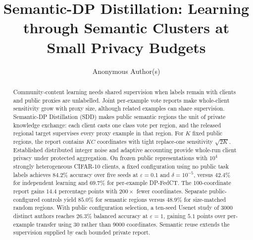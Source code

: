 \documentclass[sigconf,anonymous,review,balance=false]{acmart}
\begin{document}
\title[Semantic-DP Distillation]{Semantic-DP Distillation: Learning through Semantic Clusters
at Small Privacy Budgets}

\author{Anonymous Author(s)}

\begin{abstract}
Community-content learning needs shared supervision when labels remain with
clients and public proxies are unlabelled. Joint per-example vote reports make
whole-client sensitivity grow with proxy size, although related examples can
share supervision. Semantic-DP Distillation (SDD) makes public semantic regions
the unit of private knowledge exchange: each client casts one class vote per
region, and the released regional target supervises every proxy example in
that region. For $K$ fixed public regions, the report contains $KC$ coordinates
with tight replace-one sensitivity $\sqrt{2K}$. Established distributed integer
noise and adaptive accounting provide whole-run client privacy under protected
aggregation. On frozen public representations with $10^4$ strongly
heterogeneous CIFAR-10 clients, a fixed configuration using no public task
labels achieves $84.2\%$ accuracy over five seeds at $\varepsilon=0.1$ and
$\delta=10^{-5}$, versus $42.4\%$ for independent learning and $69.7\%$ for
per-example DP-FedCT. The 100-coordinate report gains $14.4$ percentage points
with $200\times$ fewer coordinates. Separate public-configured controls yield
$85.0\%$ for semantic regions versus $48.9\%$ for size-matched random regions.
With public configuration selection, a ten-seed Usenet study of 3000 distinct
authors reaches $26.3\%$ balanced accuracy at $\varepsilon=1$, gaining $5.1$
points over per-example transfer using 30 rather than 9000 coordinates.
Semantic reuse extends the supervision supplied by each bounded private report.
\end{abstract}




\maketitle
\makeatletter
{}
\makeatother








\clearpage




\end{document}
